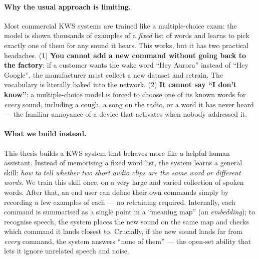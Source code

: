 \documentclass[12pt,a4paper]{article}
\begin{document}
\paragraph{Why the usual approach is limiting.}
Most commercial KWS systems are trained like a multiple-choice exam: the model
is shown thousands of examples of a \emph{fixed} list of words and learns to pick
exactly one of them for any sound it hears. This works, but it has two practical
headaches. (1) \textbf{You cannot add a new command without going back to the
factory}: if a customer wants the wake word ``Hey Aurora'' instead of ``Hey
Google'', the manufacturer must collect a new dataset and retrain. The vocabulary
is literally baked into the network. (2) \textbf{It cannot say ``I don't know''}:
a multiple-choice model is forced to choose one of its known words for
\emph{every} sound, including a cough, a song on the radio, or a word it has
never heard --- the familiar annoyance of a device that activates when nobody
addressed it.

\paragraph{What we build instead.}
This thesis builds a KWS system that behaves more like a helpful human assistant.
Instead of memorising a fixed word list, the system learns a general skill:
\emph{how to tell whether two short audio clips are the same word or different
words}. We train this skill once, on a very large and varied collection of spoken
words. After that, an end user can define their own commands simply by recording
a few examples of each --- no retraining required. Internally, each command is
summarised as a single point in a ``meaning map'' (an \emph{embedding}); to
recognise speech, the system places the new sound on the same map and checks
which command it lands closest to. Crucially, if the new sound lands far from
\emph{every} command, the system answers ``none of them'' --- the open-set
ability that lets it ignore unrelated speech and noise.
\end{document}
